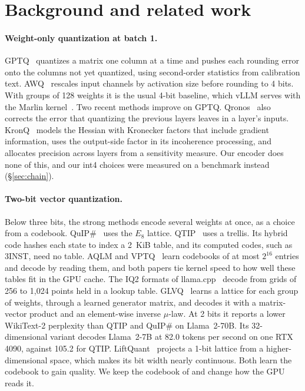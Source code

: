 \section{Background and related work}
\label{sec:background}

\paragraph{Weight-only quantization at batch 1.} GPTQ~\citep{gptq2023}
quantizes a matrix one column at a time and pushes each rounding error onto the
columns not yet quantized, using second-order statistics from calibration text.
AWQ~\citep{awq2024} rescales input channels by activation size before rounding
to 4 bits. With groups of 128 weights it is the usual 4-bit baseline, which
vLLM serves with the Marlin kernel~\citep{vllm2023,marlin2024}. Two recent
methods improve on GPTQ. Qronos~\citep{qronos2025} also corrects the error
that quantizing the previous layers leaves in a layer's inputs.
KronQ~\citep{kronq2026} models the Hessian with Kronecker factors that include
gradient information, uses the output-side factor in its incoherence
processing, and allocates precision across layers from a sensitivity measure.
Our encoder does none of this, and our int4 choices were measured on a
benchmark instead (\S\ref{sec:chain}).

\paragraph{Two-bit vector quantization.} Below three bits, the strong methods
encode several weights at once, as a choice from a codebook.
QuIP\#~\citep{quipsharp2024} uses the $E_8$ lattice. QTIP~\citep{qtip2024}
uses a trellis. Its hybrid code hashes each state to index a 2~KiB table, and
its computed codes, such as 3INST, need no table. AQLM and
VPTQ~\citep{aqlm2024,vptq2024} learn codebooks of at most $2^{16}$ entries and
decode by reading them, and both papers tie kernel speed to how well these
tables fit in the GPU cache. The IQ2 formats of llama.cpp~\citep{llamacpp}
decode from grids of 256 to 1{,}024 points held in a lookup table.
GLVQ~\citep{glvq2025} learns a lattice for each group of weights, through a
learned generator matrix, and decodes it with a matrix-vector product and an
element-wise inverse $\mu$-law. At 2 bits it reports a lower WikiText-2
perplexity than QTIP and QuIP\# on Llama~2-70B. Its 32-dimensional variant
decodes Llama~2-7B at 82.0 tokens per second on one RTX 4090, against 105.2
for QTIP. LiftQuant~\citep{liftquant2026}
projects a 1-bit lattice from a higher-dimensional space, which makes its bit
width nearly continuous. Both learn the codebook to gain quality. We keep the
codebook of \citet{llvq2026} and change how the GPU reads it.

